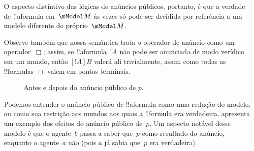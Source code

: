 \documentclass[../../../include/open-logic-section]{subfiles}
\begin{document}
O aspecto distintivo das lógicas de anúncios públicos, portanto, é que
a verdade de !!a{formula} em~$\mModel M$ às vezes só pode ser decidida
por referência a um modelo diferente do próprio~$\mModel M$.

Observe também que nossa semântica trata o operador de anúncio como um
operador~$\Box$; assim, se !!a{formula}~$!A$ não pode ser anunciada de
modo verídico em um mundo, então $[!A]B$ valerá ali trivialmente, assim
como todas as !!{formula}s $\Box$ valem em pontos terminais. 

\begin{figure}
  \begin{center}
  \end{center}
  \caption{Antes e depois do anúncio público de $p$.}
\end{figure}

Podemos entender o anúncio público de !!a{formula} como uma redução do
modelo, ou como sua restrição aos mundos nos quais a !!{formula} era
verdadeira.  apresenta um exemplo dos
efeitos do anúncio público de~$p$. Um aspecto notável desse modelo é
que o agente~$b$ passa a saber que~$p$ como resultado do anúncio,
enquanto o agente~$a$ não (pois $a$ já sabia que~$p$ era verdadeira).
\end{document}
